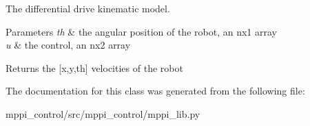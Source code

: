 The differential drive kinematic model. 


\begin{DoxyParams}{Parameters}
{\em th} & the angular position of the robot, an nx1 array \\
\hline
{\em u} & the control, an nx2 array \\
\hline
\end{DoxyParams}
\begin{DoxyReturn}{Returns}
the \mbox{[}x,y,th\mbox{]} velocities of the robot 
\end{DoxyReturn}


The documentation for this class was generated from the following file\+:\begin{DoxyCompactItemize}
\item 
mppi\+\_\+control/src/mppi\+\_\+control/mppi\+\_\+lib.\+py\end{DoxyCompactItemize}
